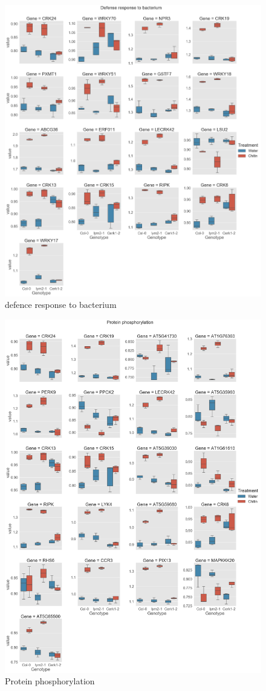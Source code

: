 \documentclass[../main.tex]{subfiles}
\begin{document}
\begin{figure}[ht]
  \centering
  \includegraphics[width=\textwidth,height=\textheight, keepaspectratio]{figures/defense response to bacterium.png}
  \caption{\label{fig:defbacterium} defence response to bacterium}
\end{figure}


\begin{figure}[ht]
  \centering
  \includegraphics[width=\textwidth, height=\textheight, keepaspectratio]{figures/protein phosphorylation.png}
  \caption{\label{fig:phosphorylation} Protein phosphorylation}
\end{figure}
\end{document}
